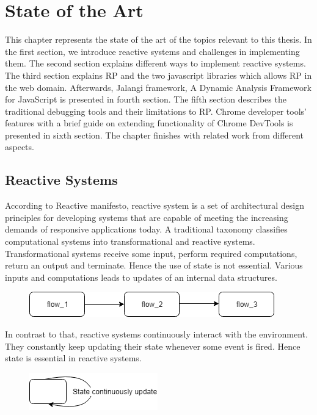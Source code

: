 \chapter{State of the Art} \label{chap:State of the Art}

This chapter represents the state of the art of the topics relevant to this thesis. In the first section, we introduce reactive systems and challenges in implementing them. The second section explains different ways to implement reactive systems. The third section explains RP and the two javascript libraries which allows RP in the web domain. Afterwards, Jalangi framework, A Dynamic Analysis Framework for JavaScript is presented in fourth section. The fifth section describes the traditional debugging tools and their limitations to RP. Chrome developer tools' features with a brief guide on extending functionality of Chrome DevTools is presented in sixth section. The chapter finishes with related work from different aspects.

\section{Reactive Systems}
According to Reactive manifesto\cite{reactiveManifesto}, reactive system is a set of architectural design principles for developing systems that are capable of meeting the increasing demands of responsive applications today. A traditional taxonomy classifies computational systems into transformational and reactive systems. Transformational systems receive some input, perform required computations, return an output and terminate. Hence the use of state is not essential. Various inputs and computations leads to updates of an internal data structures.

\begin{figure}[!h]
	\centering
	\includegraphics[scale=0.5,trim=0 0 0 0]{images/transformational_systems.png}
	\label{fig:transformational_systems}
\end{figure}

In contrast to that, reactive systems continuously interact with the environment. They constantly keep updating their state whenever some event is fired. Hence state is essential in reactive systems.

\begin{figure}[!h]
	\centering
	\includegraphics[scale=0.5,trim=0 0 0 0]{images/reactive_systems.png}
	\label{fig:reactive_systems}
\end{figure}

